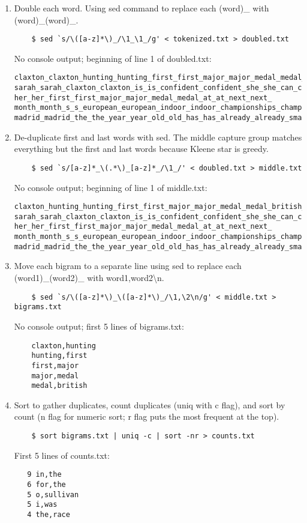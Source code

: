 \documentclass{article}
\begin{document}
\begin{enumerate}
  \item Double each word. Using sed command to replace each (word)\_ with (word)\_(word)\_.
  \begin{lstlisting}
    $ sed `s/\([a-z]*\)_/\1_\1_/g' < tokenized.txt > doubled.txt\end{lstlisting} %
  No console output; beginning of line 1 of doubled.txt:
  \begin{lstlisting}
claxton_claxton_hunting_hunting_first_first_major_major_medal_medal_british_british_hurdler_hurdler_ sarah_sarah_claxton_claxton_is_is_confident_confident_she_she_can_can_win_win_ her_her_first_first_major_major_medal_medal_at_at_next_next_ month_month_s_s_european_european_indoor_indoor_championships_championships_in_in_ madrid_madrid_the_the_year_year_old_old_has_has_already_already_smashed_smashed_...\end{lstlisting}

  \item De-duplicate first and last words with sed. The middle capture group matches everything but the first and last words because Kleene star is greedy.
  \begin{lstlisting}
    $ sed `s/[a-z]*_\(.*\)_[a-z]*_/\1_/' < doubled.txt > middle.txt\end{lstlisting} %
  No console output; beginning of line 1 of middle.txt:
  \begin{lstlisting}
claxton_hunting_hunting_first_first_major_major_medal_medal_british_british_hurdler_hurdler_ sarah_sarah_claxton_claxton_is_is_confident_confident_she_she_can_can_win_win_ her_her_first_first_major_major_medal_medal_at_at_next_next_ month_month_s_s_european_european_indoor_indoor_championships_championships_in_in_ madrid_madrid_the_the_year_year_old_old_has_has_already_already_smashed_smashed_...\end{lstlisting}

  \item Move each bigram to a separate line using sed to replace each (word1)\_(word2)\_ with word1,word2\textbackslash n.
  \begin{lstlisting}
    $ sed `s/\([a-z]*\)_\([a-z]*\)_/\1,\2\n/g' < middle.txt > bigrams.txt\end{lstlisting} %
  No console output; first 5 lines of bigrams.txt:
  \begin{lstlisting}
    claxton,hunting
    hunting,first
    first,major
    major,medal
    medal,british\end{lstlisting}

  \item Sort to gather duplicates, count duplicates (uniq with c flag), and sort by count (n flag for numeric sort; r flag puts the most frequent at the top).
  \begin{lstlisting}
    $ sort bigrams.txt | uniq -c | sort -nr > counts.txt\end{lstlisting} %
  First 5 lines of counts.txt:
  \begin{lstlisting}
   9 in,the
   6 for,the
   5 o,sullivan
   5 i,was
   4 the,race\end{lstlisting}


\end{enumerate}
\end{document}
